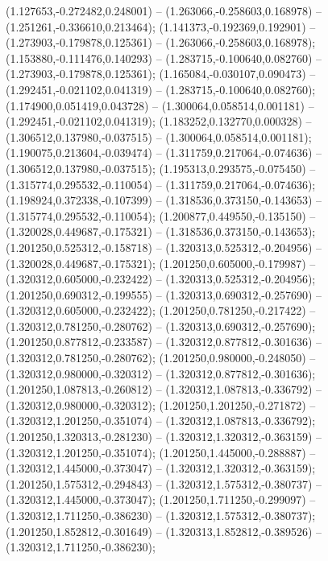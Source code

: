  (1.127653,-0.272482,0.248001) -- (1.263066,-0.258603,0.168978) -- (1.251261,-0.336610,0.213464);
 (1.141373,-0.192369,0.192901) -- (1.273903,-0.179878,0.125361) -- (1.263066,-0.258603,0.168978);
 (1.153880,-0.111476,0.140293) -- (1.283715,-0.100640,0.082760) -- (1.273903,-0.179878,0.125361);
 (1.165084,-0.030107,0.090473) -- (1.292451,-0.021102,0.041319) -- (1.283715,-0.100640,0.082760);
 (1.174900,0.051419,0.043728) -- (1.300064,0.058514,0.001181) -- (1.292451,-0.021102,0.041319);
 (1.183252,0.132770,0.000328) -- (1.306512,0.137980,-0.037515) -- (1.300064,0.058514,0.001181);
 (1.190075,0.213604,-0.039474) -- (1.311759,0.217064,-0.074636) -- (1.306512,0.137980,-0.037515);
 (1.195313,0.293575,-0.075450) -- (1.315774,0.295532,-0.110054) -- (1.311759,0.217064,-0.074636);
 (1.198924,0.372338,-0.107399) -- (1.318536,0.373150,-0.143653) -- (1.315774,0.295532,-0.110054);
 (1.200877,0.449550,-0.135150) -- (1.320028,0.449687,-0.175321) -- (1.318536,0.373150,-0.143653);
 (1.201250,0.525312,-0.158718) -- (1.320313,0.525312,-0.204956) -- (1.320028,0.449687,-0.175321);
 (1.201250,0.605000,-0.179987) -- (1.320312,0.605000,-0.232422) -- (1.320313,0.525312,-0.204956);
 (1.201250,0.690312,-0.199555) -- (1.320313,0.690312,-0.257690) -- (1.320312,0.605000,-0.232422);
 (1.201250,0.781250,-0.217422) -- (1.320312,0.781250,-0.280762) -- (1.320313,0.690312,-0.257690);
 (1.201250,0.877812,-0.233587) -- (1.320312,0.877812,-0.301636) -- (1.320312,0.781250,-0.280762);
 (1.201250,0.980000,-0.248050) -- (1.320312,0.980000,-0.320312) -- (1.320312,0.877812,-0.301636);
 (1.201250,1.087813,-0.260812) -- (1.320312,1.087813,-0.336792) -- (1.320312,0.980000,-0.320312);
 (1.201250,1.201250,-0.271872) -- (1.320312,1.201250,-0.351074) -- (1.320312,1.087813,-0.336792);
 (1.201250,1.320313,-0.281230) -- (1.320312,1.320312,-0.363159) -- (1.320312,1.201250,-0.351074);
 (1.201250,1.445000,-0.288887) -- (1.320312,1.445000,-0.373047) -- (1.320312,1.320312,-0.363159);
 (1.201250,1.575312,-0.294843) -- (1.320312,1.575312,-0.380737) -- (1.320312,1.445000,-0.373047);
 (1.201250,1.711250,-0.299097) -- (1.320312,1.711250,-0.386230) -- (1.320312,1.575312,-0.380737);
 (1.201250,1.852812,-0.301649) -- (1.320313,1.852812,-0.389526) -- (1.320312,1.711250,-0.386230);

